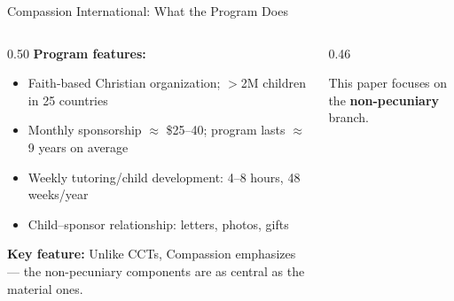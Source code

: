 \documentclass[aspectratio=169, 10pt]{beamer}
\begin{document}
\begin{frame}{Compassion International: What the Program Does}
  \begin{columns}
    \begin{column}{0.50\textwidth}
      \textbf{Program features:}
      \begin{itemize}
        \item Faith-based Christian organization; $>$2M children in 25 countries
        \item Monthly sponsorship $\approx$ \$25--40; program lasts $\approx$9 years on average
        \item Weekly tutoring/child development: 4--8 hours, 48 weeks/year
        \item Child--sponsor relationship: letters, photos, gifts
      \end{itemize}
      \vspace{0.4em}
      \textbf{Key feature:} Unlike CCTs, Compassion emphasizes  --- the non-pecuniary components are as central as the material ones.
    \end{column}
    \begin{column}{0.46\textwidth}
      \begin{center}
      \end{center}
      \vspace{0.2em}
      {\small \color{medgray} This paper focuses on the \textbf{non-pecuniary} branch.}
    \end{column}
  \end{columns}
\end{frame}
\end{document}
